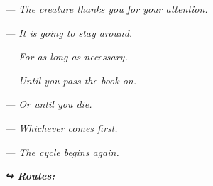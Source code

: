 \noindent \textit{--- The creature thanks you for your attention.}

\noindent \textit{--- It is going to stay around.}

\noindent \textit{--- For as long as necessary.}

\noindent \textit{--- Until you pass the book on.}

\noindent \textit{--- Or until you die.}

\noindent \textit{--- Whichever comes first.}

\noindent \textit{--- The cycle begins again.}

\vspace{0.5em}
\noindent\textit{\textbf{↪ Routes:}  \rotasep {} \rotasep {} \rotasep {}}
